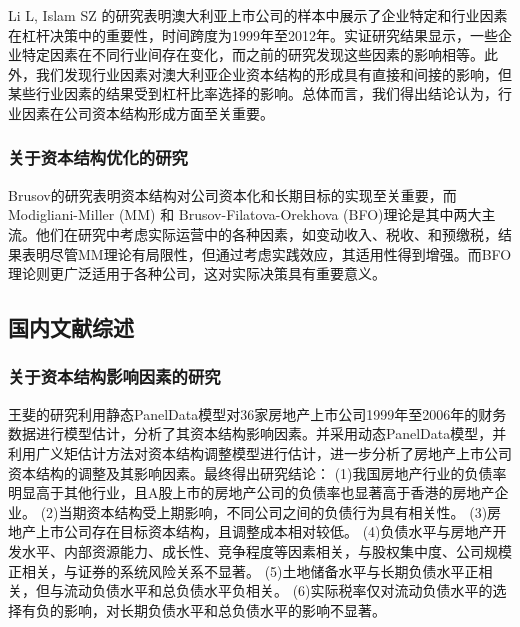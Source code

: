 Li L, Islam SZ 的研究表明澳大利亚上市公司的样本中展示了企业特定和行业因素在杠杆决策中的重要性，时间跨度为1999年至2012年。实证研究结果显示，一些企业特定因素在不同行业间存在变化，而之前的研究发现这些因素的影响相等。此外，我们发现行业因素对澳大利亚企业资本结构的形成具有直接和间接的影响，但某些行业因素的结果受到杠杆比率选择的影响。总体而言，我们得出结论认为，行业因素在公司资本结构形成方面至关重要。\cite{Li2019a}
\subsubsection{关于资本结构优化的研究}
Brusov的研究表明资本结构对公司资本化和长期目标的实现至关重要，而Modigliani-Miller (MM) 和 Brusov-Filatova-Orekhova (BFO)理论是其中两大主流。他们在研究中考虑实际运营中的各种因素，如变动收入、税收、和预缴税，结果表明尽管MM理论有局限性，但通过考虑实践效应，其适用性得到增强。而BFO理论则更广泛适用于各种公司，这对实际决策具有重要意义。\cite{Brusov2023}

\subsection{国内文献综述}

\subsubsection{关于资本结构影响因素的研究}
王斐\cite{Wang2008}的研究利用静态PanelData模型对36家房地产上市公司1999年至2006年的财务数据进行模型估计，分析了其资本结构影响因素。并采用动态PanelData模型，并利用广义矩估计方法对资本结构调整模型进行估计，进一步分析了房地产上市公司资本结构的调整及其影响因素。最终得出研究结论：
(1)我国房地产行业的负债率明显高于其他行业，且A股上市的房地产公司的负债率也显著高于香港的房地产企业。
(2)当期资本结构受上期影响，不同公司之间的负债行为具有相关性。
(3)房地产上市公司存在目标资本结构，且调整成本相对较低。
(4)负债水平与房地产开发水平、内部资源能力、成长性、竞争程度等因素相关，与股权集中度、公司规模正相关，与证券的系统风险关系不显著。
(5)土地储备水平与长期负债水平正相关，但与流动负债水平和总负债水平负相关。
(6)实际税率仅对流动负债水平的选择有负的影响，对长期负债水平和总负债水平的影响不显著。 \cite{Wang2008}


